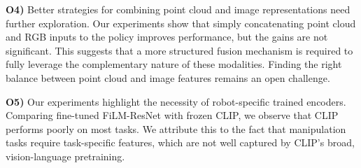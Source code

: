 \textbf{O4)} Better strategies for combining point cloud and image representations need further exploration. Our experiments show that simply concatenating point cloud and RGB inputs to the policy improves performance, but the gains are not significant. This suggests that a more structured fusion mechanism is required to fully leverage the complementary nature of these modalities. Finding the right balance between point cloud and image features remains an open challenge.


\textbf{O5)} Our experiments highlight the necessity of robot-specific trained encoders. Comparing fine-tuned FiLM-ResNet with frozen CLIP, we observe that CLIP performs poorly on most tasks. We attribute this to the fact that manipulation tasks require task-specific features, which are not well captured by CLIP’s broad, vision-language pretraining.